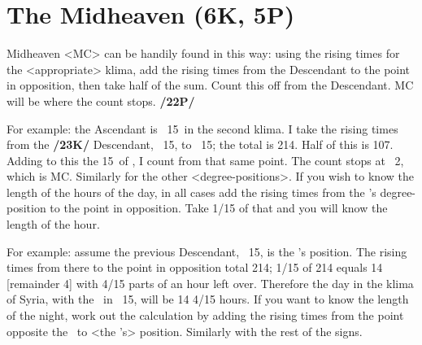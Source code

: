 \section{The Midheaven (6K, 5P)}
Midheaven <MC> can be handily found in this way: using the rising times for the <appropriate> klima, add the rising times from the Descendant to the point in opposition, then take half of the sum.
Count this off from the Descendant. MC will be where the count stops. \textbf{/22P/} 

For example: the Ascendant is \Capricorn\, 15\deg\, in the second klima. I take the rising times from the \textbf{/23K/} Descendant, \Cancer\, 15\deg, to \Capricorn\, 15\deg; the total is 214. Half of this is 107. Adding to this the 15\deg\, of \Cancer, I count from that same point. The count stops at \Scorpio\, 2\deg, which is MC. Similarly for the other <degree-positions>.
If you wish to know the length of the hours of the day, in all cases add the rising times from the \Sun’s degree-position to the point in opposition. Take 1/15 of that and you will know the length of the hour.

For example: assume the previous Descendant, \Cancer\, 15\deg, is the \Sun’s position. The rising times from there to the point in opposition total 214; 1/15 of 214 equals 14 [remainder 4] with 4/15 parts of an hour left over. Therefore the day in the klima of Syria, with the \Sun\, in \Cancer\, 15\deg, will be 14 4/15 hours. 
If you want to know the length of the night, work out the calculation by adding the rising times from the point opposite the \Sun\, to <the \Sun’s> position. Similarly with the rest of the signs.

\newpage